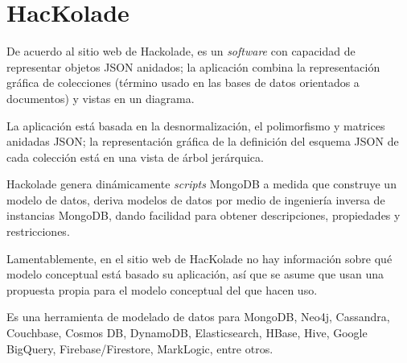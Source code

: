 \section{HacKolade}
De acuerdo al sitio web de Hackolade\cite{hackolade_hackolade_2020}, es un \textit{software} con capacidad de representar objetos JSON anidados; la aplicación combina la representación gráfica de colecciones (término usado en las bases de datos orientados a documentos) y vistas en un diagrama.


La aplicación está basada en la desnormalización, el polimorfismo y matrices anidadas JSON; la representación gráfica de la definición del esquema JSON de cada colección está en una vista de árbol jerárquica. 


Hackolade genera dinámicamente \textit{scripts} MongoDB a medida que construye un modelo de datos, deriva modelos de datos por medio de ingeniería inversa de instancias MongoDB, dando facilidad para obtener descripciones, propiedades y restricciones.


Lamentablemente, en el sitio web de HacKolade no hay información sobre qué modelo conceptual está basado su aplicación, así que se asume que usan una propuesta propia para el modelo conceptual del que hacen uso.


Es una herramienta de modelado de datos para MongoDB, Neo4j, Cassandra, Couchbase, Cosmos DB, DynamoDB, Elasticsearch, HBase, Hive, Google BigQuery, Firebase/Firestore, MarkLogic, entre otros.
